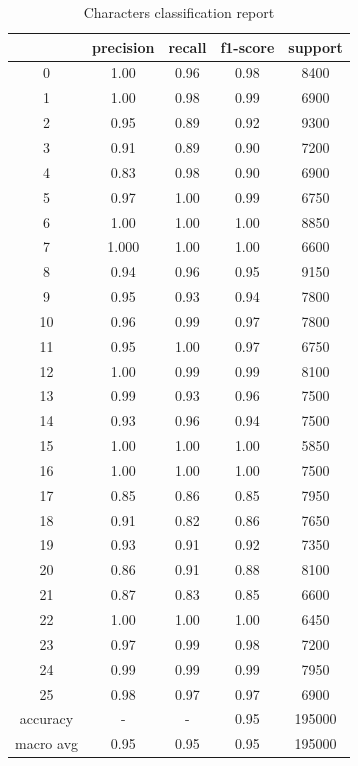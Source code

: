 \begin{table}[h]
	\centering
	\begin{tabular}{|c|c|c|c|c|}
		\hline
		& precision & recall & f1-score & support \\
		\hline
		0 & 1.00 & 0.96 & 0.98 & 8400 \\
		\hline
		1 & 1.00 & 0.98 & 0.99 & 6900 \\
		\hline
		2 & 0.95 & 0.89 & 0.92 & 9300 \\
		\hline
		3 & 0.91 & 0.89 & 0.90 & 7200 \\
		\hline
		4 & 0.83 & 0.98 & 0.90 & 6900 \\
		\hline
		5 & 0.97 & 1.00 & 0.99 & 6750 \\
		\hline
		6 & 1.00 & 1.00 & 1.00 & 8850 \\
		\hline
		7 & 1.000 & 1.00 & 1.00 & 6600 \\
		\hline
		8 & 0.94 & 0.96 & 0.95 & 9150 \\
		\hline
		9 & 0.95 & 0.93 & 0.94 & 7800 \\
		\hline
		10 & 0.96 & 0.99 & 0.97 & 7800 \\
		\hline
		11 & 0.95 & 1.00 & 0.97 & 6750 \\
		\hline
		12 & 1.00 & 0.99 & 0.99 & 8100 \\
		\hline
		13 & 0.99 & 0.93 & 0.96 & 7500 \\
		\hline
		14 & 0.93 & 0.96 & 0.94 & 7500 \\
		\hline
		15 & 1.00 & 1.00 & 1.00 & 5850 \\
		\hline
		16 & 1.00 & 1.00 & 1.00 & 7500 \\
		\hline
		17 & 0.85 & 0.86 & 0.85 & 7950 \\
		\hline
		18 & 0.91 & 0.82 & 0.86 & 7650 \\
		\hline
		19 & 0.93 & 0.91 & 0.92 & 7350 \\
		\hline
		20 & 0.86 & 0.91 & 0.88 & 8100 \\
		\hline
		21 & 0.87 & 0.83 & 0.85 & 6600 \\
		\hline
		22 & 1.00 & 1.00 & 1.00 & 6450 \\
		\hline
		23 & 0.97 & 0.99 & 0.98 & 7200 \\
		\hline
		24 & 0.99 & 0.99 & 0.99 & 7950 \\
		\hline
		25 & 0.98 & 0.97 & 0.97 & 6900 \\
		\hline
		accuracy & - & - & 0.95 & 195000 \\
		\hline
		macro avg & 0.95 & 0.95 & 0.95 & 195000 \\
		\hline
	\end{tabular}
	\caption{Characters classification report}
	\label{tab:characters_classification_report}
\end{table}